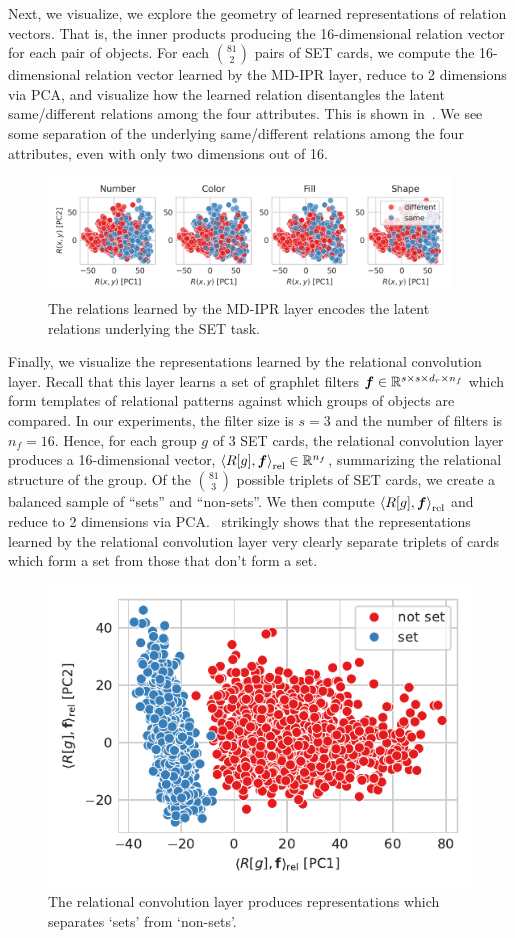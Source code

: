 Next, we visualize, we explore the geometry of learned representations of relation vectors. That is, the inner products producing the 16-dimensional relation vector for each pair of objects. For each $\binom{81}{2}$ pairs of SET cards, we compute the 16-dimensional relation vector learned by the MD-IPR layer, reduce to 2 dimensions via PCA, and visualize how the learned relation disentangles the latent same/different relations among the four attributes. This is shown in~. We see some separation of the underlying same/different relations among the four attributes, even with only two dimensions out of 16.

\begin{figure}[h]
    \centering
    \includegraphics[width=0.95\textwidth]{figs/representation_analysis/mdipr_rel_rep.png}
    \caption{The relations learned by the MD-IPR layer encodes the latent relations underlying the SET task.}\label{fig:mdipr_rel_rep}
\end{figure}

Finally, we visualize the representations learned by the relational convolution layer. Recall that this layer learns a set of graphlet filters $\bm{f} \in \mathbb{R}^{s \times s \times d_r \times n_f}$ which form templates of relational patterns against which groups of objects are compared. In our experiments, the filter size is $s = 3$ and the number of filters is $n_f = 16$. Hence, for each group $g$ of 3 SET cards, the relational convolution layer produces a 16-dimensional vector, $\left\langle R[g], \bm{f} \right\rangle_\mathrm{rel} \in \mathbb{R}^{n_f}$, summarizing the relational structure of the group. Of the $\binom{81}{3}$ possible triplets of SET cards, we create a balanced sample of ``sets'' and ``non-sets''. We then compute $\left\langle R[g], \bm{f} \right\rangle_\mathrm{rel}$ and reduce to 2 dimensions via PCA.~ strikingly shows that the representations learned by the relational convolution layer very clearly separate triplets of cards which form a set from those that don't form a set.

\begin{figure}[h]
    \centering
    \includegraphics{figs/representation_analysis/conv_rep.pdf}
    \caption{The relational convolution layer produces representations which separates `sets' from `non-sets'.}\label{fig:conv_rep}
\end{figure}